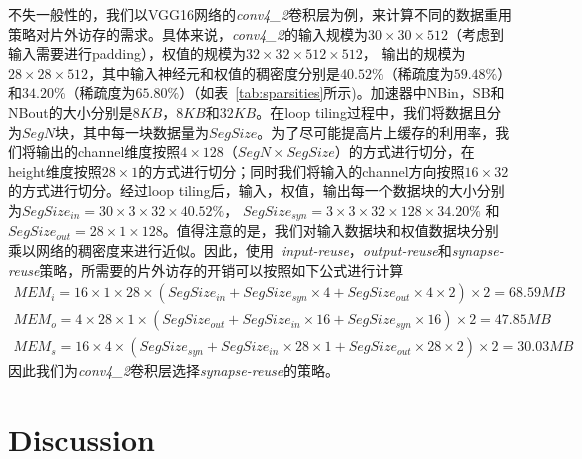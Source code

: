 不失一般性的，我们以VGG16网络的\emph{conv4\_2}卷积层为例，来计算不同的数据重用策略对片外访存的需求。具体来说，\emph{conv4\_2}的输入规模为$30\times 30\times 512$（考虑到输入需要进行padding），权值的规模为$32\times 32\times 512\times 512$， 输出的规模为$28\times 28\times 512$，其中输入神经元和权值的稠密度分别是$40.52\%$（稀疏度为$59.48\%$）和$34.20\%$（稀疏度为$65.80\%$）（如表~\ref{tab:sparsities}所示)。加速器中NBin，SB和NBout的大小分别是$8KB$，$8KB$和$32KB$。在loop tiling过程中，我们将数据且分为$SegN$块，其中每一块数据量为$SegSize$。为了尽可能提高片上缓存的利用率，我们将输出的channel维度按照$4\times 128$（$SegN\times SegSize$）的方式进行切分，在height维度按照$28\times 1$的方式进行切分；同时我们将输入的channel方向按照$16\times 32$的方式进行切分。经过loop tiling后，输入，权值，输出每一个数据块的大小分别为$SegSize_{in} = 30\times 3\times 32\times 40.52\%$， $SegSize_{syn} = 3\times 3\times 32\times 128\times 34.20\%$ 和 $SegSize_{out} = 28\times 1\times 128$。值得注意的是，我们对输入数据块和权值数据块分别乘以网络的稠密度来进行近似。因此，使用~\emph{input-reuse}，\emph{output-reuse}和\emph{synapse-reuse}策略，所需要的片外访存的开销可以按照如下公式进行计算
\begin{gather*}
MEM_{i} = 16 \times 1 \times 28 \times (SegSize_{in} + SegSize_{syn} \times 4 + SegSize_{out} \times 4 \times 2)\times 2 = 68.59MB \\
MEM_{o} = 4 \times 28 \times 1 \times (SegSize_{out} + SegSize_{in} \times 16 + SegSize_{syn} \times 16)\times 2 = 47.85MB \\
MEM_{s} = 16 \times 4 \times (SegSize_{syn} + SegSize_{in} \times 28 \times 1 + SegSize_{out} \times 28 \times 2)\times 2 = 30.03MB 
\end{gather*}
因此我们为\emph{conv4\_2}卷积层选择\emph{synapse-reuse}的策略。


\section{Discussion}







